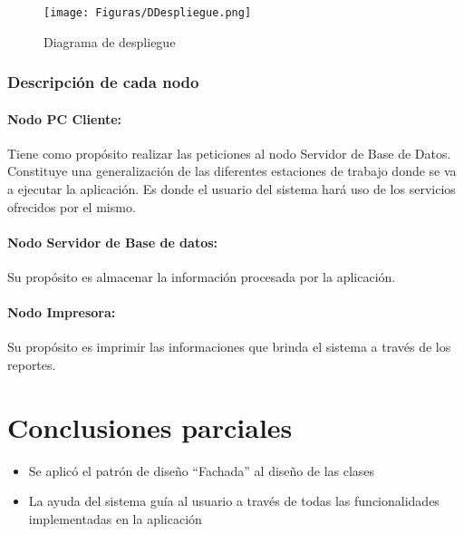 \begin{figure}[H] %
	\centering
	\texttt{[image: Figuras/DDespliegue.png]}
	\caption{Diagrama de despliegue}
	\label{fig:DDespliegue}
\end{figure}

\subsubsection*{Descripción de cada nodo}
\paragraph{Nodo PC Cliente:}Tiene como propósito realizar las peticiones al nodo Servidor de Base de Datos. Constituye una generalización de las diferentes estaciones de trabajo donde se va a ejecutar la aplicación. Es donde el usuario del sistema hará uso de los servicios ofrecidos por el mismo. 
\paragraph{Nodo Servidor de Base de datos:}Su propósito es almacenar la información procesada por la aplicación. 
\paragraph{Nodo Impresora:}Su propósito es imprimir las informaciones que brinda el sistema a través de los reportes.

\section{Conclusiones parciales}
\begin{itemize}
	\item Se aplicó el patrón de diseño “Fachada” al diseño de las clases
	\item La ayuda del sistema guía al usuario a través de todas las funcionalidades implementadas en la aplicación
\end{itemize}